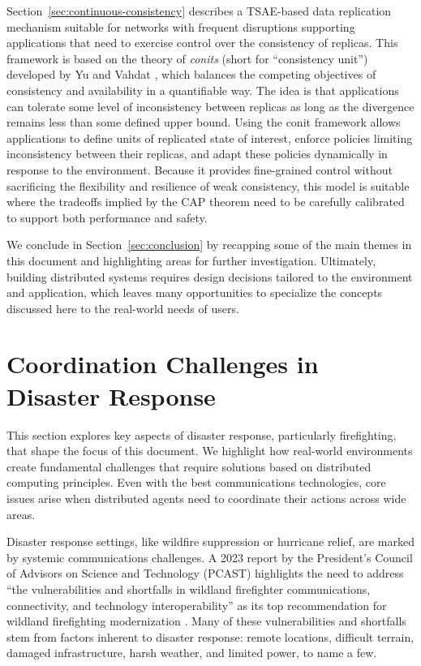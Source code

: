 \documentclass[]             %
{NASA}                       %
\theoremstyle{definition}
\begin{document}
Section~\ref{sec:continuous-consistency} describes a TSAE-based data
replication mechanism suitable for networks with frequent disruptions
supporting applications that need to exercise control over the
consistency of replicas. This framework is based on the theory of
\emph{conits} (short for ``consistency unit'') developed by Yu and
Vahdat \cite{2002tact}, which balances the competing objectives of
consistency and availability in a quantifiable way. The idea is that
applications can tolerate some level of inconsistency between replicas
as long as the divergence remains less than some defined upper
bound. Using the conit framework allows applications to define units
of replicated state of interest, enforce policies limiting
inconsistency between their replicas, and adapt these policies
dynamically in response to the environment. Because it provides
fine-grained control without sacrificing the flexibility and
resilience of weak consistency, this model is suitable where the
tradeoffs implied by the CAP theorem need to be carefully calibrated
to support both performance and safety.

We conclude in Section~\ref{sec:conclusion} by recapping some of the
main themes in this document and highlighting areas for further
investigation. Ultimately, building distributed systems requires
design decisions tailored to the environment and application, which
leaves many opportunities to specialize the concepts discussed here to
the real-world needs of users.

\section{Coordination Challenges in Disaster Response}
\label{sec:disaster-response}
This section explores key aspects of disaster response, particularly
firefighting, that shape the focus of this document. We highlight how
real-world environments create fundamental challenges that require
solutions based on distributed computing principles. Even with the
best communications technologies, core issues arise when distributed
agents need to coordinate their actions across wide areas.

Disaster response settings, like wildfire suppression or hurricane
relief, are marked by systemic communications challenges. A 2023
report by the President’s Council of Advisors on Science and
Technology (PCAST) highlights the need to address ``the
vulnerabilities and shortfalls in wildland firefighter communications,
connectivity, and technology interoperability'' as its top
recommendation for wildland firefighting modernization
\cite{pcast2023}. Many of these vulnerabilities and shortfalls stem
from factors inherent to disaster response: remote locations,
difficult terrain, damaged infrastructure, harsh weather, and limited
power, to name a few.
\end{document}
